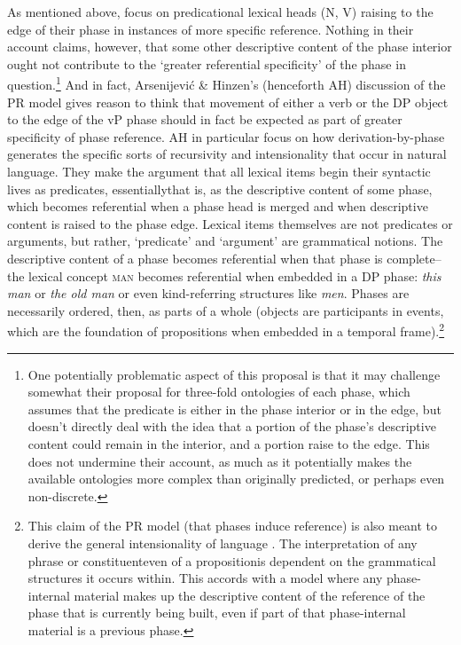 \documentclass[output=paper
,modfonts
,nonflat
]{langsci/langscibook}
\begin{document}
As mentioned above, \citet{SheehanHinzen:2011} focus on predicational lexical heads (N, V) raising to the edge of their phase in instances of more specific reference. Nothing in their account claims, however, that some other descriptive content of the phase interior ought not contribute to the `greater referential specificity' of the phase in question.\footnote{One potentially problematic aspect of this proposal is that it may challenge somewhat their proposal for three-fold ontologies of each phase, which assumes that the predicate is either in the phase interior or in the edge, but doesn’t directly deal with the idea that a portion of the phase's descriptive content could remain in the interior, and a portion raise to the edge. This does not undermine their account, as much as it potentially makes the available ontologies more complex than originally predicted, or perhaps even non-discrete.}  And in fact, Arsenijevi{\'c} \& Hinzen's \citeyear{ArsenijevicHinzen:2012} (henceforth AH) discussion of the PR model gives reason to think that movement of either a verb or the DP object to the edge of the vP phase should in fact be expected as part of greater specificity of phase reference. AH in particular focus on how derivation-by-phase generates the specific sorts of recursivity and intensionality that occur in natural language. They make the argument that all lexical items begin their syntactic lives as predicates, essentially\textemdash that is, as the descriptive content of some phase, which becomes referential when a phase head is merged and when descriptive content is raised to the phase edge. Lexical items themselves are not predicates or arguments, but rather, `predicate' and `argument' are grammatical notions. The descriptive content of a phase becomes referential when that phase is complete–the lexical concept \textsc{man} becomes referential when embedded in a DP phase: \textit{this man} or \textit{the old man} or even kind-referring structures like \textit{men}. Phases are necessarily ordered, then, as parts of a whole (objects are participants in events, which are the foundation of propositions when embedded in a temporal frame).\footnote{This claim of the PR model (that phases induce reference) is also meant to derive the general intensionality of language \citep{Hinzen:2014b,ArsenijevicHinzen:2012,HinzenSheehan:2013}. The interpretation of any phrase or constituent\textemdash even of a proposition\textemdash is dependent on the grammatical structures it occurs within. This accords with a model where any phase-internal material makes up the descriptive content of the reference of the phase that is currently being built, even if part of that phase-internal material is a previous phase.} 
\end{document}
